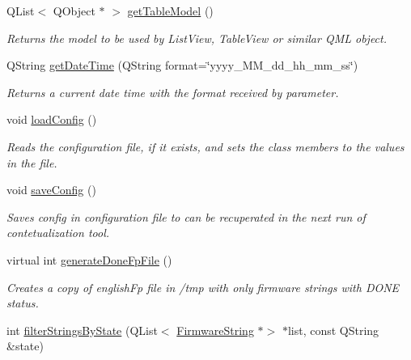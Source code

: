 \begin{DoxyCompactItemize}
Q\+List$<$ Q\+Object $\ast$ $>$ \mbox{\hyperlink{classContextualizationController_a6c8aba56f5b97fc3042c6e5c8e04e124}{get\+Table\+Model}} ()
\begin{DoxyCompactList}\small\item\em Returns the model to be used by List\+View, Table\+View or similar Q\+ML object. \end{DoxyCompactList}\item 
Q\+String \mbox{\hyperlink{classContextualizationController_ab3824ba2a20c6f4b511fb6169a4349da}{get\+Date\+Time}} (Q\+String format=\char`\"{}yyyy\+\_\+\+M\+M\+\_\+dd\+\_\+hh\+\_\+mm\+\_\+ss\char`\"{})
\begin{DoxyCompactList}\small\item\em Returns a current date time with the format received by parameter. \end{DoxyCompactList}\item 
\mbox{\label{classContextualizationController_a3b3d997f77ec6cd8cfe7569b81c31d3f}} 
void \mbox{\hyperlink{classContextualizationController_a3b3d997f77ec6cd8cfe7569b81c31d3f}{load\+Config}} ()
\begin{DoxyCompactList}\small\item\em Reads the configuration file, if it exists, and sets the class members to the values in the file. \end{DoxyCompactList}\item 
\mbox{\label{classContextualizationController_a4cfa5ebd6d0e2c1843fe6073c02873f3}} 
void \mbox{\hyperlink{classContextualizationController_a4cfa5ebd6d0e2c1843fe6073c02873f3}{save\+Config}} ()
\begin{DoxyCompactList}\small\item\em Saves config in configuration file to can be recuperated in the next run of contetualization tool. \end{DoxyCompactList}\item 
virtual int \mbox{\hyperlink{classContextualizationController_af142a8bbd561278c3423ccad3b40c910}{generate\+Done\+Fp\+File}} ()
\begin{DoxyCompactList}\small\item\em Creates a copy of english\+Fp file in /tmp with only firmware strings with D\+O\+NE status. \end{DoxyCompactList}\item 
int \mbox{\hyperlink{classContextualizationController_a627fba866e282e4e7dff813781ed88cb}{filter\+Strings\+By\+State}} (Q\+List$<$ \mbox{\hyperlink{classFirmwareString}{Firmware\+String}} $\ast$$>$ $\ast$list, const Q\+String \&state)
$$
\end{DoxyCompactItemize}
